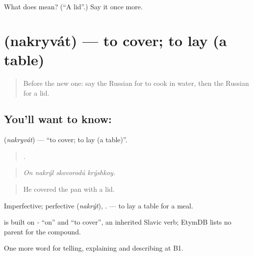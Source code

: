 \begin{tcolorbox}[breakable,colback=teal!4,colframe=teal!35!black,title={Before you move on}]
What does  mean? (\textquotedblleft{}A lid\textquotedblright{}.) Say it once more.
\end{tcolorbox}
\section[\texorpdfstring{\ru{накрывать} (nakryvát)}{накрывать (nakryvát)}]{ (nakryvát) — to cover; to lay (a table)}

\label{lesson:RU-C329-nakryvat}



\begin{quote}
Before the new one: say the Russian for to cook in water, then the Russian for a lid.
\end{quote}

\subsection*{You'll want to know: }
\textbf{} (\emph{nakryvát}) — \textquotedblleft{}to cover; to lay (a table)\textquotedblright{}.

\begin{quote}
   .
\end{quote}

\begin{quote}
\emph{On nakrýl skovorodú krýshkoy.}
\end{quote}

\begin{quote}
He covered the pan with a lid.
\end{quote}

Imperfective; perfective \emph{} (\emph{nakrýt}), \emph{}. \emph{  } — to lay a table for a meal.

\begin{cousinweb}
\emph{} is built on \emph{-} \textquotedblleft{}on\textquotedblright{} and \emph{} \textquotedblleft{}to cover\textquotedblright{}, an inherited Slavic verb; EtymDB lists no parent for the compound.
\end{cousinweb}

\begin{grammarlens}[title={What you've built}]
One more word for telling, explaining and describing at B1.
\end{grammarlens}

